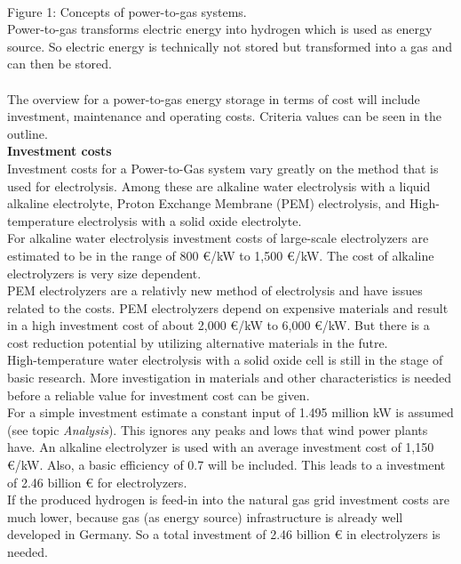 \documentclass[11pt,a4paper]{article}
\begin{document}
\begin{parcolumns}[colwidths={1=2.5 cm, 2=10 cm, 3=2.5 cm}]{3}
{\\
Figure 1: Concepts of power-to-gas systems. \\
Power-to-gas transforms electric energy into hydrogen which is used as energy source. So electric energy is technically not stored but transformed into a gas and can then be stored.
\\ \\
The overview for a power-to-gas energy storage in terms of cost will include investment, maintenance and operating costs. Criteria values can be seen in the outline.
\\
\textbf{Investment costs}
\\
Investment costs for a Power-to-Gas system vary greatly on the method that is used for electrolysis. Among these are alkaline water electrolysis with a liquid alkaline electrolyte, Proton Exchange Membrane (PEM) electrolysis, and High-temperature electrolysis with a solid oxide electrolyte.
\\
For alkaline water electrolysis investment costs of large-scale electrolyzers are estimated to be in the range of 800 \euro /kW to 1,500 \euro /kW. The cost of alkaline electrolyzers is very size dependent.
\\
PEM electrolyzers are a relativly new method of electrolysis and have issues related to the costs. PEM electrolyzers depend on expensive materials and result in a high investment cost of about 2,000 \euro /kW to 6,000 \euro /kW. But there is a cost reduction potential by utilizing alternative materials in the futre.
\\
High-temperature water electrolysis with a solid oxide cell is still in the stage of basic research. More investigation in materials and other characteristics is needed before a reliable value for investment cost can be given.
\\
For a simple investment estimate a constant input of 1.495 million kW is assumed (see topic \textit{Analysis}). This ignores any peaks and lows that wind power plants have. An alkaline electrolyzer is used with an average investment cost of 1,150 \euro /kW. Also, a basic efficiency of 0.7 will be included. This leads to a investment of 2.46 billion \euro{ }for electrolyzers. \\
If the produced hydrogen is feed-in into the natural gas grid investment costs are much lower, because gas (as energy source) infrastructure is already well developed in Germany. So a total investment of 2.46 billion \euro{ } in electrolyzers is needed.  \\
}
\end{parcolumns}
\end{document}
